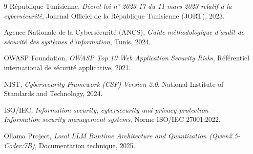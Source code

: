 \documentclass[11pt,a4paper,oneside]{article}
\begin{document}
\begin{thebibliography}{9}
République Tunisienne, \emph{Décret-loi n° 2023-17 du 11 mars 2023 relatif à la cybersécurité}, Journal Officiel de la République Tunisienne (JORT), 2023.

Agence Nationale de la Cybersécurité (ANCS), \emph{Guide méthodologique d'audit de sécurité des systèmes d'information}, Tunis, 2024.

OWASP Foundation, \emph{OWASP Top 10 Web Application Security Risks}, Référentiel international de sécurité applicative, 2021.

NIST, \emph{Cybersecurity Framework (CSF) Version 2.0}, National Institute of Standards and Technology, 2024.

ISO/IEC, \emph{Information security, cybersecurity and privacy protection -- Information security management systems}, Norme ISO/IEC 27001:2022.

Ollama Project, \emph{Local LLM Runtime Architecture and Quantization (Qwen2.5-Coder:7B)}, Documentation technique, 2025.
\end{thebibliography}
\end{document}
